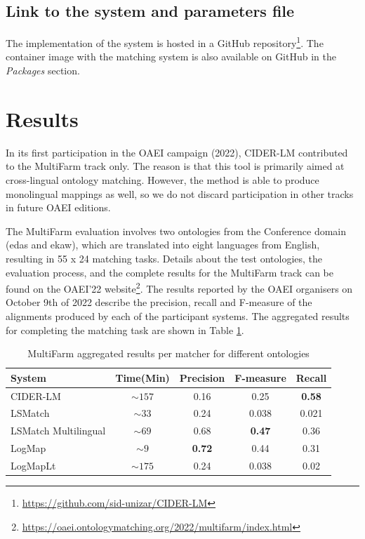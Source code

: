 \documentclass[
]{ceurart}
\begin{document}
\subsection{Link to the system and parameters file}\label{sec:system-link}

The implementation of the system is hosted in a GitHub repository\footnote{\url{https://github.com/sid-unizar/CIDER-LM}}. The container image with the matching system is also available on GitHub in the \textit{Packages} section. 

\section{Results}

In its first participation in the OAEI campaign (2022), CIDER-LM contributed to the MultiFarm track only. The reason is that this tool is primarily aimed at cross-lingual ontology matching. However, the method is able to produce monolingual mappings as well, so we do not discard participation in other tracks in future OAEI editions. 

The MultiFarm evaluation involves two ontologies from the Conference domain (edas and ekaw), which are translated into eight languages from English, resulting in 55 x 24 matching tasks.
Details about the test ontologies, the evaluation process, and the complete results for the MultiFarm track can be found on the OAEI'22 website\footnote{\url{https://oaei.ontologymatching.org/2022/multifarm/index.html}}.
The results reported by the OAEI organisers on October 9th of 2022 describe the precision, recall and F-measure of the alignments produced by each of the participant systems. The aggregated results for completing the matching task are shown in Table \ref{tab:multifarm-results}.

\begin{table}
	\caption{MultiFarm aggregated results per matcher for different ontologies}
	\label{tab:multifarm-results}
	\begin{tabular}{lcccc}
	  \toprule
	  System & Time(Min) & Precision & F-measure & Recall\\
	  \midrule
	   CIDER-LM             & $\sim 157$ & 0.16    			& 0.25     			& \textbf{0.58}    \\
	   LSMatch              & $\sim 33$  & 0.24    			& 0.038    			& 0.021            \\
	   LSMatch Multilingual & $\sim 69$  & 0.68    			& \textbf{0.47}     & 0.36             \\
	   LogMap               & $\sim 9$   & \textbf{0.72}    & 0.44     			& 0.31             \\
	   LogMapLt             & $\sim 175$ & 0.24    			& 0.038    			& 0.02             \\
	\bottomrule
  \end{tabular}
  \end{table}
\end{document}

